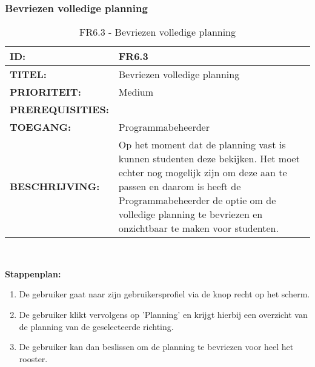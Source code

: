 \subsubsection{Bevriezen volledige planning}
\noindent\begin{table}[H]
            \begin{tabular}{l | p{10cm}}
                \textbf{ID:} & FR6.3 \\ \hline
                \textbf{TITEL:} & Bevriezen volledige planning\\ \hline
                \textbf{PRIORITEIT:} &  Medium \\ \hline
                \textbf{PREREQUISITIES:} & \\ \hline
                \textbf{TOEGANG:} & Programmabeheerder \\ \hline
                \textbf{BESCHRIJVING:} & Op het moment dat de planning vast is kunnen studenten deze bekijken. Het moet echter nog mogelijk zijn om deze aan te passen en daarom is heeft de Programmabeheerder de optie om de volledige planning te bevriezen en onzichtbaar te maken voor studenten.\\ 
            \end{tabular}\\
            \caption{FR6.3 - Bevriezen volledige planning}
            \label{tab:FR6.3 - Bevriezen volledige planning}
        \end{table}   

\textbf{Stappenplan:}
	\begin{enumerate}
	\item De gebruiker gaat naar zijn gebruikersprofiel via de knop recht op het scherm.
	\item De gebruiker klikt vervolgens op 'Planning' en krijgt hierbij een overzicht van de planning van de geselecteerde richting.
	\item De gebruiker kan dan beslissen om de planning te bevriezen voor heel het rooster.
	\end{enumerate}	


